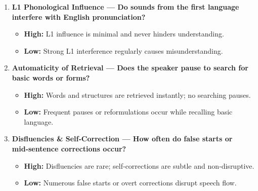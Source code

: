 \documentclass{report}
\begin{document}
\begin{enumerate}
  \item \textbf{L1 Phonological Influence — Do sounds from the first language interfere with English pronunciation?}
  \begin{itemize}
    \item \textbf{High:} L1 influence is minimal and never hinders understanding.
    \item \textbf{Low:} Strong L1 interference regularly causes misunderstanding.
  \end{itemize}

  \item \textbf{Automaticity of Retrieval — Does the speaker pause to search for basic words or forms?}
  \begin{itemize}
    \item \textbf{High:} Words and structures are retrieved instantly; no searching pauses.
    \item \textbf{Low:} Frequent pauses or reformulations occur while recalling basic language.
  \end{itemize}

  \item \textbf{Disfluencies \& Self‑Correction — How often do false starts or mid‑sentence corrections occur?}
  \begin{itemize}
    \item \textbf{High:} Disfluencies are rare; self‑corrections are subtle and non‑disruptive.
    \item \textbf{Low:} Numerous false starts or overt corrections disrupt speech flow.
  \end{itemize}
\end{enumerate}
\end{document}
